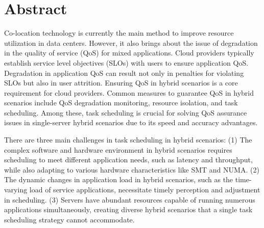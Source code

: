 \intobmk\chapter*{Abstract}%

Co-location technology is currently the main method to improve resource utilization in data centers. However, it also brings about the issue of degradation in the quality of service (QoS) for mixed applications. Cloud providers typically establish service level objectives (SLOs) with users to ensure application QoS. Degradation in application QoS can result not only in penalties for violating SLOs but also in user attrition. Ensuring QoS in hybrid scenarios is a core requirement for cloud providers. Common measures to guarantee QoS in hybrid scenarios include QoS degradation monitoring, resource isolation, and task scheduling. Among these, task scheduling is crucial for solving QoS assurance issues in single-server hybrid scenarios due to its speed and accuracy advantages.

There are three main challenges in task scheduling in hybrid scenarios: (1) The complex software and hardware environment in hybrid scenarios requires scheduling to meet different application needs, such as latency and throughput, while also adapting to various hardware characteristics like SMT and NUMA. (2) The dynamic changes in application load in hybrid scenarios, such as the time-varying load of service applications, necessitate timely perception and adjustment in scheduling. (3) Servers have abundant resources capable of running numerous applications simultaneously, creating diverse hybrid scenarios that a single task scheduling strategy cannot accommodate.

